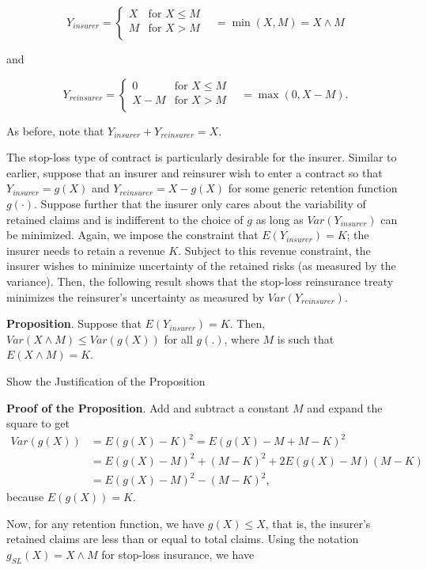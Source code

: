 \documentclass[]{book}
\theoremstyle{definition}
\theoremstyle{definition}
\theoremstyle{definition}
\theoremstyle{remark}
\begin{document}
\[
Y_{insurer} =
\begin{cases}
X & \text{for } X \le M\\
M & \text{for } X >M \\
\end{cases} \ \ \ \ = \min(X,M) = X \wedge M
\]

and

\[
Y_{reinsurer} =
\begin{cases}
0 & \text{for } X \le M\\
X- M &  \text{for } X >M \\
\end{cases} \ \ \ \  = \max(0,X-M) .
\]

As before, note that \(Y_{insurer}+Y_{reinsurer}=X\).

The stop-loss type of contract is particularly desirable for the
insurer. Similar to earlier, suppose that an insurer and reinsurer wish
to enter a contract so that \(Y_{insurer}=g(X)\) and
\(Y_{reinsurer}=X-g(X)\) for some generic retention function
\(g(\cdot)\). Suppose further that the insurer only cares about the
variability of retained claims and is indifferent to the choice of \(g\)
as long as \(Var(Y_{insurer})\) can be minimized. Again, we impose the
constraint that \(E(Y_{insurer}) = K\); the insurer needs to retain a
revenue \(K\). Subject to this revenue constraint, the insurer wishes to
minimize uncertainty of the retained risks (as measured by the
variance). Then, the following result shows that the stop-loss
reinsurance treaty minimizes the reinsurer's uncertainty as measured by
\(Var(Y_{reinsurer})\).

\textbf{Proposition}. Suppose that \(E(Y_{insurer})=K.\) Then,
\(Var (X \wedge M) \le Var(g(X))\) for all \(g(.)\), where \(M\) is such
that \(E(X \wedge M)=K\).

Show the Justification of the Proposition

\hypertarget{toggleProofStopLoss}{}
\textbf{Proof of the Proposition}. Add and subtract a constant \(M\) and
expand the square to get \[
\begin{array}{ll}
Var(g(X)) &= E (g(X) - K)^2 = E (g(X) -M +M- K)^2 \\
&= E (g(X) -M)^2 +  (M- K)^2 +2 E (g(X) -M)(M- K) \\
&= E (g(X) -M)^2 -  (M- K)^2 ,
\end{array}
\] because \(E(g(X))= K.\)

Now, for any retention function, we have \(g(X) \le X\), that is, the
insurer's retained claims are less than or equal to total claims. Using
the notation \(g_{SL}(X) = X \wedge M\) for stop-loss insurance, we have
\end{document}
